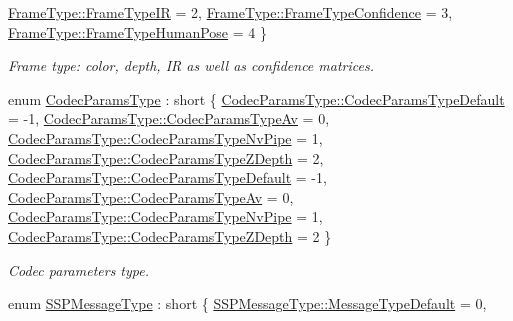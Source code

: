 \begin{DoxyCompactItemize}
\hyperlink{namespacemoetsi_1_1ssp_a46efdfa2cd5a28ead465dcc8006b5a87a2c799f7416882b538fa8295567f65cf5}{Frame\+Type\+::\+Frame\+Type\+IR} = 2, 
\newline
\hyperlink{namespacemoetsi_1_1ssp_a46efdfa2cd5a28ead465dcc8006b5a87a1b85b2c60b857778932e29e0e5021ba1}{Frame\+Type\+::\+Frame\+Type\+Confidence} = 3, 
\hyperlink{namespacemoetsi_1_1ssp_a46efdfa2cd5a28ead465dcc8006b5a87aa4b26dd8fd8d1f8a6ba0cc75f2302018}{Frame\+Type\+::\+Frame\+Type\+Human\+Pose} = 4
 \}\begin{DoxyCompactList}\small\item\em Frame type\+: color, depth, IR as well as confidence matrices. \end{DoxyCompactList}
\item 
enum \hyperlink{namespacemoetsi_1_1ssp_a6d638ba0bd38e9daded08f633d893563}{Codec\+Params\+Type} \+: short \{ \newline
\hyperlink{namespacemoetsi_1_1ssp_a6d638ba0bd38e9daded08f633d893563a1ffd3a6c06641b95d3e5142403ed0730}{Codec\+Params\+Type\+::\+Codec\+Params\+Type\+Default} = -\/1, 
\hyperlink{namespacemoetsi_1_1ssp_a6d638ba0bd38e9daded08f633d893563a55e78e5ce82b1d5dcfbb2381af26698f}{Codec\+Params\+Type\+::\+Codec\+Params\+Type\+Av} = 0, 
\hyperlink{namespacemoetsi_1_1ssp_a6d638ba0bd38e9daded08f633d893563ac818f912b0dd4cd2868a1a03d5c570a1}{Codec\+Params\+Type\+::\+Codec\+Params\+Type\+Nv\+Pipe} = 1, 
\hyperlink{namespacemoetsi_1_1ssp_a6d638ba0bd38e9daded08f633d893563a4e738f8ec62ed2fd5d5675f71b291992}{Codec\+Params\+Type\+::\+Codec\+Params\+Type\+Z\+Depth} = 2, 
\newline
\hyperlink{namespacemoetsi_1_1ssp_a6d638ba0bd38e9daded08f633d893563a1ffd3a6c06641b95d3e5142403ed0730}{Codec\+Params\+Type\+::\+Codec\+Params\+Type\+Default} = -\/1, 
\hyperlink{namespacemoetsi_1_1ssp_a6d638ba0bd38e9daded08f633d893563a55e78e5ce82b1d5dcfbb2381af26698f}{Codec\+Params\+Type\+::\+Codec\+Params\+Type\+Av} = 0, 
\hyperlink{namespacemoetsi_1_1ssp_a6d638ba0bd38e9daded08f633d893563ac818f912b0dd4cd2868a1a03d5c570a1}{Codec\+Params\+Type\+::\+Codec\+Params\+Type\+Nv\+Pipe} = 1, 
\hyperlink{namespacemoetsi_1_1ssp_a6d638ba0bd38e9daded08f633d893563a4e738f8ec62ed2fd5d5675f71b291992}{Codec\+Params\+Type\+::\+Codec\+Params\+Type\+Z\+Depth} = 2
 \}\begin{DoxyCompactList}\small\item\em Codec parameters type. \end{DoxyCompactList}
\item 
enum \hyperlink{namespacemoetsi_1_1ssp_a8948545ffe48a5b3507fd10a1e56d546}{S\+S\+P\+Message\+Type} \+: short \{ \hyperlink{namespacemoetsi_1_1ssp_a8948545ffe48a5b3507fd10a1e56d546a16d065ca1ae16532bc3115ec68734080}{S\+S\+P\+Message\+Type\+::\+Message\+Type\+Default} = 0, 

\end{DoxyCompactItemize}

